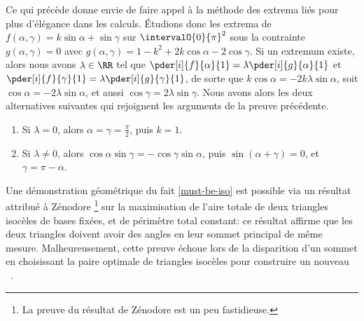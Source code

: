 \begin{remark}
    Ce qui précède donne envie de faire appel à la méthode des extrema liés pour plus d'élégance dans les calculs.
    Étudions donc les extrema de
	$f(\alpha , \gamma) = k \sin \alpha + \sin \gamma$
	sur $\intervalO{0}{\pi}^2$ sous la contrainte
	$g(\alpha , \gamma) = 0$
	avec
	$g(\alpha , \gamma) = 1 - k^2 + 2 k \cos \alpha - 2 \cos \gamma$.
    Si un extremum existe, alors nous avons $\lambda \in \RR$ tel que
    $\pder[i]{f}{\alpha}{1} = \lambda \pder[i]{g}{\alpha}{1}$
	et
    $\pder[i]{f}{\gamma}{1} = \lambda \pder[i]{g}{\gamma}{1}$,
	de sorte que
	$k \cos \alpha = - 2 k \lambda \sin \alpha$,
	soit
	$\cos \alpha = - 2 \lambda \sin \alpha$,
	et aussi
	$\cos \gamma = 2 \lambda \sin \gamma$.
	Nous avons alors les deux alternatives suivantes qui rejoignent les arguments de la preuve précédente.
	\begin{enumerate}
	    \item Si $\lambda = 0$,
	    alors
	    $\alpha = \gamma = \frac{\pi}{2}$, puis $k = 1$. 

	    \item Si $\lambda \neq 0$,
	    alors
	    $\cos \alpha \sin \gamma = - \cos \gamma \sin \alpha$,
	    puis
	    $\sin (\alpha + \gamma) = 0$,
	    et
	    $\gamma = \pi - \alpha$.
	\end{enumerate}
\end{remark}


%    


\begin{remark}
	Une démonstration géométrique du fait \ref{must-be-iso} est possible via un résultat attribué à Zénodore%
	\footnote{
	    La preuve du résultat de Zénodore est un peu fastidieuse.
	}
	sur la maximisation de l'aire totale de deux triangles isocèles de bases fixées, et de périmètre total constant:
	ce résultat affirme que les deux triangles doivent avoir des angles en leur sommet principal de même mesure.
	Malheureusement, cette preuve échoue lors de la disparition d'un sommet en choisissant la paire optimale de triangles isocèles pour construire un nouveau \ngone\ .
\end{remark}





